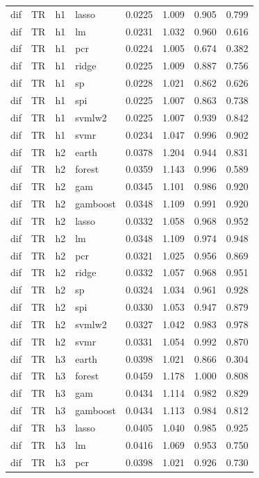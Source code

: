 \begin{ThreePartTable}
\begin{longtable}[t]{llclcccc}
dif & TR & h1 & lasso & 0.0225 & 1.009 & 0.905 & 0.799\\
dif & TR & h1 & lm & 0.0231 & 1.032 & 0.960 & 0.616\\
dif & TR & h1 & pcr & 0.0224 & 1.005 & 0.674 & 0.382\\
dif & TR & h1 & ridge & 0.0225 & 1.009 & 0.887 & 0.756\\
dif & TR & h1 & sp & 0.0228 & 1.021 & 0.862 & 0.626\\
dif & TR & h1 & spi & 0.0225 & 1.007 & 0.863 & 0.738\\
dif & TR & h1 & svmlw2 & 0.0225 & 1.007 & 0.939 & 0.842\\
dif & TR & h1 & svmr & 0.0234 & 1.047 & 0.996 & 0.902\\
\addlinespace
dif & TR & h2 & earth & 0.0378 & 1.204 & 0.944 & 0.831\\
dif & TR & h2 & forest & 0.0359 & 1.143 & 0.996 & 0.589\\
dif & TR & h2 & gam & 0.0345 & 1.101 & 0.986 & 0.920\\
dif & TR & h2 & gamboost & 0.0348 & 1.109 & 0.991 & 0.920\\
dif & TR & h2 & lasso & 0.0332 & 1.058 & 0.968 & 0.952\\
dif & TR & h2 & lm & 0.0348 & 1.109 & 0.974 & 0.948\\
dif & TR & h2 & pcr & 0.0321 & 1.025 & 0.956 & 0.869\\
dif & TR & h2 & ridge & 0.0332 & 1.057 & 0.968 & 0.951\\
dif & TR & h2 & sp & 0.0324 & 1.034 & 0.961 & 0.928\\
dif & TR & h2 & spi & 0.0330 & 1.053 & 0.947 & 0.879\\
dif & TR & h2 & svmlw2 & 0.0327 & 1.042 & 0.983 & 0.978\\
dif & TR & h2 & svmr & 0.0331 & 1.054 & 0.992 & 0.870\\
\addlinespace
dif & TR & h3 & earth & 0.0398 & 1.021 & 0.866 & 0.304\\
dif & TR & h3 & forest & 0.0459 & 1.178 & 1.000 & 0.808\\
dif & TR & h3 & gam & 0.0434 & 1.114 & 0.982 & 0.829\\
dif & TR & h3 & gamboost & 0.0434 & 1.113 & 0.984 & 0.812\\
dif & TR & h3 & lasso & 0.0405 & 1.040 & 0.985 & 0.925\\
dif & TR & h3 & lm & 0.0416 & 1.069 & 0.953 & 0.750\\
dif & TR & h3 & pcr & 0.0398 & 1.021 & 0.926 & 0.730\\

\end{longtable}
\end{ThreePartTable}
